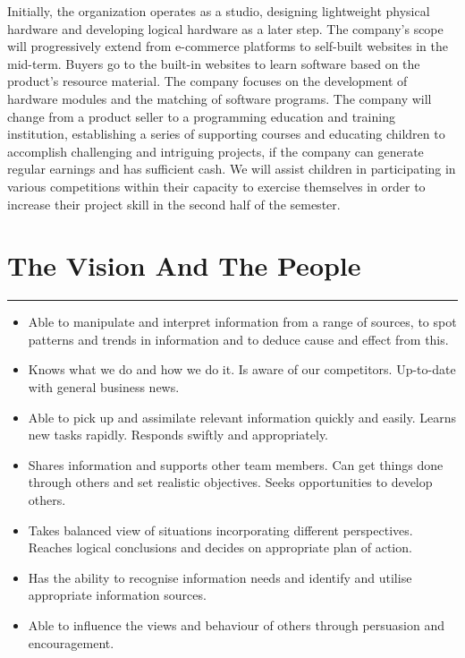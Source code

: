 \documentclass[12pt]{extarticle}
\numberwithin{figure}{section}
\begin{document}
Initially, the organization operates as a studio, designing lightweight physical hardware and developing logical hardware as a later step. The company's scope will progressively extend from e-commerce platforms to self-built websites in the mid-term. Buyers go to the built-in websites to learn software based on the product's resource material. The company focuses on the development of hardware modules and the matching of software programs. The company will change from a product seller to a programming education and training institution, establishing a series of supporting courses and educating children to accomplish challenging and intriguing projects, if the company can generate regular earnings and has sufficient cash. We will assist children in participating in various competitions within their capacity to exercise themselves in order to increase their project skill in the second half of the semester.

\section{The Vision And The People}
\vspace{-0.1cm}
\hrule
\vspace{0.2cm}
\begin{itemize}
    \setlength{\itemsep}{0pt}
          \setlength{\parsep}{0pt}
          \setlength{\parskip}{0pt}
    \item {\normalsize  Able to manipulate and interpret information from a range of sources, to spot patterns and trends in information and to deduce cause and effect from this.}
    \item  {\normalsize Knows what we do and how we do it. Is aware of our competitors. Up-to-date with general business news. }
    \item  {\normalsize Able to pick up and assimilate relevant information quickly and easily. Learns new tasks rapidly. Responds swiftly and appropriately.}
    \item  {\normalsize Shares information and supports other team members. Can get things done through others and set realistic objectives. Seeks opportunities to develop others.}
    \item {\normalsize Takes balanced view of situations incorporating different perspectives. Reaches logical conclusions and decides on appropriate plan of action.}
    \item {\normalsize Has the ability to recognise information needs and identify and utilise appropriate information sources.}
    \item {\normalsize Able to influence the views and behaviour of others through persuasion and encouragement.}
\end{itemize}
\end{document}
